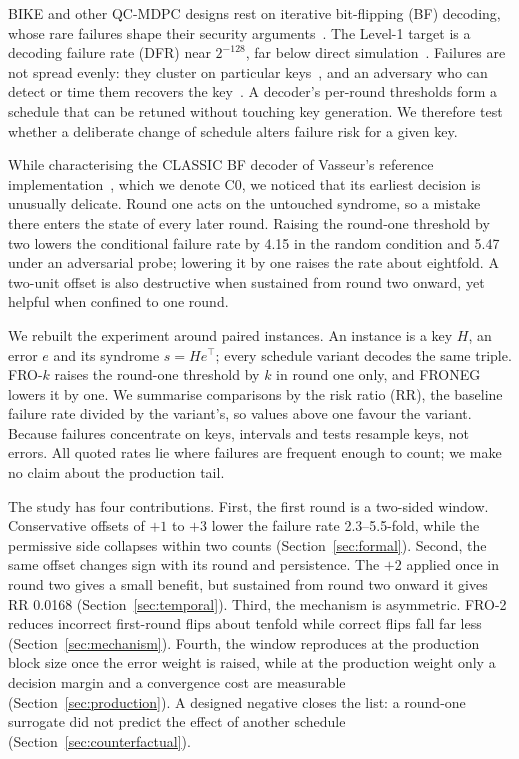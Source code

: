 \documentclass[runningheads,a4paper]{llncs}
\begin{document}
BIKE and other QC-MDPC designs rest on iterative bit-flipping (BF) decoding, whose rare failures shape their security arguments~\cite{misoczki2013mdpc,bike2024spec,alagic2025nist}. The Level-1 target is a decoding failure rate (DFR) near $2^{-128}$, far below direct simulation~\cite{sendrier2019dfr,vasseur2021thesis}. Failures are not spread evenly: they cluster on particular keys~\cite{guo2016key,wang2023weak,nosouhi2023weakkey}, and an adversary who can detect or time them recovers the key~\cite{eaton2018timing}. A decoder's per-round thresholds form a schedule that can be retuned without touching key generation. We therefore test whether a deliberate change of schedule alters failure risk for a given key.

While characterising the CLASSIC BF decoder of Vasseur's reference implementation~\cite{vasseur2021thesis}, which we denote C0, we noticed that its earliest decision is unusually delicate. Round one acts on the untouched syndrome, so a mistake there enters the state of every later round. Raising the round-one threshold by two lowers the conditional failure rate by 4.15 in the random condition and 5.47 under an adversarial probe; lowering it by one raises the rate about eightfold. A two-unit offset is also destructive when sustained from round two onward, yet helpful when confined to one round.

We rebuilt the experiment around paired instances. An instance is a key $H$, an error $e$ and its syndrome $s=He^{\top}$; every schedule variant decodes the same triple. FRO-$k$ raises the round-one threshold by $k$ in round one only, and FRONEG lowers it by one. We summarise comparisons by the risk ratio (RR), the baseline failure rate divided by the variant's, so values above one favour the variant. Because failures concentrate on keys, intervals and tests resample keys, not errors. All quoted rates lie where failures are frequent enough to count; we make no claim about the production tail.

The study has four contributions. First, the first round is a two-sided window. Conservative offsets of $+1$ to $+3$ lower the failure rate 2.3--5.5-fold, while the permissive side collapses within two counts (Section~\ref{sec:formal}). Second, the same offset changes sign with its round and persistence. The $+2$ applied once in round two gives a small benefit, but sustained from round two onward it gives RR 0.0168 (Section~\ref{sec:temporal}). Third, the mechanism is asymmetric. FRO-2 reduces incorrect first-round flips about tenfold while correct flips fall far less (Section~\ref{sec:mechanism}). Fourth, the window reproduces at the production block size once the error weight is raised, while at the production weight only a decision margin and a convergence cost are measurable (Section~\ref{sec:production}). A designed negative closes the list: a round-one surrogate did not predict the effect of another schedule (Section~\ref{sec:counterfactual}).
\end{document}
